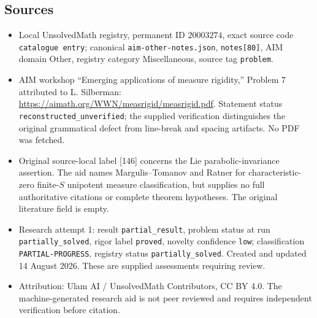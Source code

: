 \documentclass[11pt]{article}
\begin{document}
\subsection{Sources}
\begin{itemize}
\item Local UnsolvedMath registry, permanent ID \(20003274\), exact source code \texttt{catalogue entry}; canonical \texttt{aim-other-notes.json}, \texttt{notes[80]}, AIM domain Other, registry category Miscellaneous, source tag \texttt{problem}.
\item AIM workshop ``Emerging applications of measure rigidity,'' Problem 7 attributed to L. Silberman: \url{https://aimath.org/WWN/measrigid/measrigid.pdf}. Statement status \texttt{reconstructed\_unverified}; the supplied verification distinguishes the original grammatical defect from line-break and spacing artifacts. No PDF was fetched.
\item Original source-local label [146] concerns the Lie parabolic-invariance assertion. The aid names Margulis--Tomanov and Ratner for characteristic-zero finite-\(S\) unipotent measure classification, but supplies no full authoritative citations or complete theorem hypotheses. The original literature field is empty.
\item Research attempt 1: result \texttt{partial\_result}, problem status at run \texttt{partially\_solved}, rigor label \texttt{proved}, novelty confidence \texttt{low}; classification \texttt{PARTIAL-PROGRESS}, registry status \texttt{partially\_solved}. Created and updated 14 August 2026. These are supplied assessments requiring review.
\item Attribution: Ulam AI / UnsolvedMath Contributors, CC BY 4.0. The machine-generated research aid is not peer reviewed and requires independent verification before citation.
\end{itemize}
\end{document}
